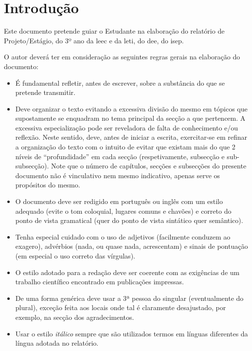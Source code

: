 
\chapter{Introdução} 	%
\label{Chapter1} 		%


Este documento pretende guiar o Estudante na elaboração do relatório de Projeto/Estágio, do 3º ano da \ac{leec} e da \ac{leti}, do \ac{dee}, do \ac{isep}.

O autor deverá ter em consideração as seguintes regras gerais na elaboração do documento:

\begin{itemize}
	\item É fundamental refletir, antes de escrever, sobre a substância do que se pretende transmitir.
	\item Deve organizar o texto evitando a excessiva divisão do mesmo em tópicos que supostamente se enquadram no tema principal da secção a que pertencem. A excessiva especialização pode ser reveladora de falta de conhecimento e/ou reflexão. Neste sentido, deve, antes de iniciar a escrita, exercitar-se em refinar a organização do texto com o intuito de evitar que existam mais do que 2 níveis de ``profundidade'' em cada secção (respetivamente, subsecção e sub-subsecção). Note que o número de capítulos, secções e subsecções do presente documento não é vinculativo nem mesmo indicativo, apenas serve os propósitos do mesmo.
	\item O documento deve ser redigido em português ou inglês com um estilo adequado (evite o tom coloquial, lugares comuns e chavões) e correto do ponto de vista gramatical (quer do ponto de vista sintático quer semântico).
	\item Tenha especial cuidado com o uso de adjetivos (facilmente conduzem ao exagero), advérbios (nada, ou quase nada, acrescentam) e sinais de pontuação (em especial o uso correto das vírgulas).
	\item O estilo adotado para a redação deve ser coerente com as exigências de um trabalho científico encontrado em publicações impressas.
	\item De uma forma genérica deve usar a 3ª pessoa do singular (eventualmente do plural), exceção feita aos locais onde tal é claramente desajustado, por exemplo, na secção dos agradecimentos.
	\item Usar o estilo \textit{itálico} sempre que são utilizados termos em línguas diferentes da língua adotada no relatório.

\end{itemize}
